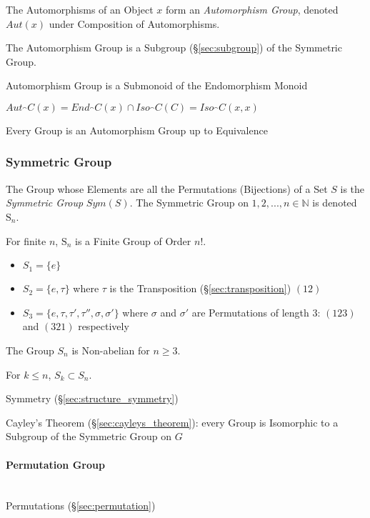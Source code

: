 The Automorphisms of an Object $x$ form an \emph{Automorphism Group},
denoted $Aut(x)$ under Composition of Automorphisms.

The Automorphism Group is a Subgroup (\S\ref{sec:subgroup}) of the
Symmetric Group.

Automorphism Group is a Submonoid of the Endomorphism Monoid %

$Aut_\cat{C}(x) = End_\cat{C}(x) \cap Iso_\cat{C}(C) =
Iso_\cat{C}(x,x)$

Every Group is an Automorphism Group up to Equivalence %



\subsubsection{Symmetric Group}\label{sec:symmetric_group}

The Group whose Elements are all the Permutations (Bijections) of a
Set $S$ is the \emph{Symmetric Group} $Sym(S)$. The Symmetric Group on
${1, 2, ..., n} \in \mathbb{N}$ is denoted $\mathrm{S}_n$.

For finite $n$, $\mathrm{S}_n$ is a Finite Group of Order $n!$.

\begin{itemize}
    \item $S_1 = \{e\}$
    \item $S_2 = \{e,\tau\}$ where $\tau$ is the Transposition
      (\S\ref{sec:transposition}) $(12)$
    \item $S_3 = \{e, \tau, \tau', \tau'', \sigma, \sigma'\}$ where
      $\sigma$ and $\sigma'$ are Permutations of length 3: $(123)$ and
      $(321)$ respectively
\end{itemize}
The Group $S_n$ is Non-abelian for $n \geq 3$.

For $k \leq n$, $S_k \subset S_n$.

Symmetry (\S\ref{sec:structure_symmetry})

Cayley's Theorem (\S\ref{sec:cayleys_theorem}): every Group is
Isomorphic to a Subgroup of the Symmetric Group on $G$



\paragraph{Permutation Group}\label{sec:permutation_group}
\hfill \\

Permutations (\S\ref{sec:permutation})

